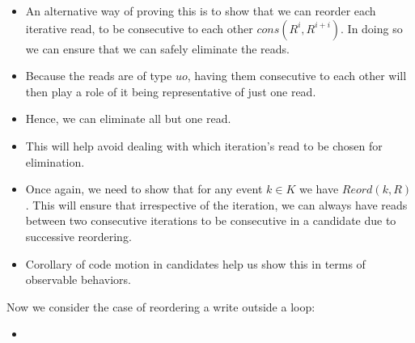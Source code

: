             \begin{itemize}
                \item An alternative way of proving this is to show that we can reorder each iterative read, to be consecutive to each other $cons(R^i, R^{i+i})$. In doing so we can ensure that we can safely eliminate the reads. 
                \item Because the reads are of type $uo$, having them consecutive to each other will then play a role of it being representative of just one read. 
                \item Hence, we can eliminate all but one read. 
                \item This will help avoid dealing with which iteration's read to be chosen for elimination. 
                \item Once again, we need to show that for any event $k \in K$ we have $Reord(k, R)$. This will ensure that irrespective of the iteration, we can always have reads between two consecutive iterations to be consecutive in a candidate due to successive reordering.
                \item Corollary of code motion in candidates help us show this in terms of observable behaviors.
            \end{itemize}

            Now we consider the case of reordering a write outside a loop:
            
            \begin{itemize}
                \item 
            \end{itemize}

